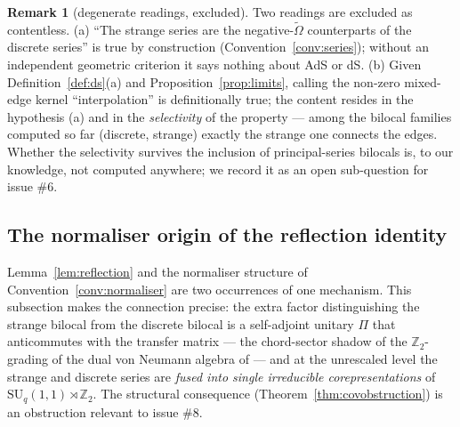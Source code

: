\documentclass[11pt,a4paper]{article}
\theoremstyle{definition}
\newtheorem{remark}[definition]{Remark}
\theoremstyle{plain}
\newcommand{\SUq}{\mathrm{SU}_q(1,1)}
\newcommand{\tCas}{\tilde\Omega}                %
\newcommand{\Z}{\mathbb{Z}}
\begin{document}
\begin{remark}[degenerate readings, excluded]\label{rem:degenerate}
Two readings are excluded as contentless. (a) ``The strange series are the negative-$\tCas$
counterparts of the discrete series'' is true by construction (Convention~\ref{conv:series});
without an independent geometric criterion it says nothing about AdS or dS. (b) Given
Definition~\ref{def:ds}(a) and Proposition~\ref{prop:limits}, calling the non-zero mixed-edge
kernel ``interpolation'' is definitionally true; the content resides in the hypothesis (a) and in
the \emph{selectivity} of the property --- among the bilocal families computed so far (discrete,
strange) exactly the strange one connects the edges. Whether the selectivity survives the
inclusion of principal-series bilocals is, to our knowledge, not computed anywhere; we record it
as an open sub-question for issue \#6.
\end{remark}

\subsection{The normaliser origin of the reflection identity}
\label{sec:normaliserorigin}


Lemma~\ref{lem:reflection} and the normaliser structure of
Convention~\ref{conv:normaliser} are two occurrences of one mechanism. This subsection makes
the connection precise: the extra factor distinguishing the strange bilocal from the discrete
bilocal is a self-adjoint unitary $\Pi$ that anticommutes with the transfer matrix ---
the chord-sector shadow of the $\Z_2$-grading of the dual von Neumann algebra of
\cite{Groenevelt:2009gkk} --- and at the unrescaled level the strange and discrete series are
\emph{fused into single irreducible corepresentations} of $\SUq\rtimes\Z_2$. The structural
consequence (Theorem~\ref{thm:covobstruction}) is an obstruction relevant to issue \#8.
\end{document}
